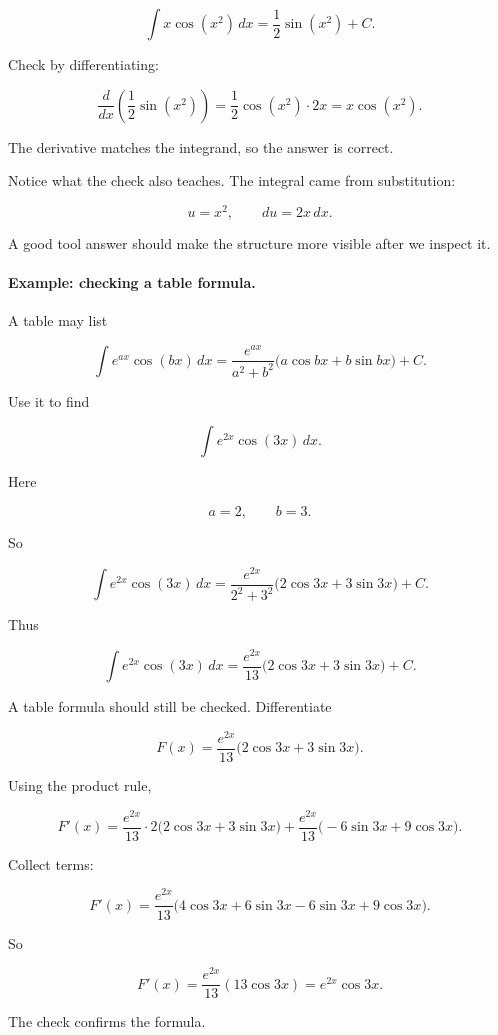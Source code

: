 \[
\int x\cos(x^2)\,dx=\frac12\sin(x^2)+C.
\]

Check by differentiating:

\[
\frac{d}{dx}\left(\frac12\sin(x^2)\right)
=
\frac12\cos(x^2)\cdot 2x
=
x\cos(x^2).
\]

The derivative matches the integrand, so the answer is correct.

Notice what the check also teaches.  The integral came from substitution:

\[
u=x^2,
\qquad
du=2x\,dx.
\]

A good tool answer should make the structure more visible after we inspect it.

\paragraph{Example: checking a table formula.}
A table may list

\[
\int e^{ax}\cos(bx)\,dx
=
\frac{e^{ax}}{a^2+b^2}\bigl(a\cos bx+b\sin bx\bigr)+C.
\]

Use it to find

\[
\int e^{2x}\cos(3x)\,dx.
\]

Here

\[
a=2,
\qquad
b=3.
\]

So

\[
\int e^{2x}\cos(3x)\,dx
=
\frac{e^{2x}}{2^2+3^2}\bigl(2\cos 3x+3\sin 3x\bigr)+C.
\]

Thus

\[
\boxed{
\int e^{2x}\cos(3x)\,dx
=
\frac{e^{2x}}{13}\bigl(2\cos 3x+3\sin 3x\bigr)+C.
}
\]

A table formula should still be checked.  Differentiate

\[
F(x)=\frac{e^{2x}}{13}\bigl(2\cos 3x+3\sin 3x\bigr).
\]

Using the product rule,

\[
F'(x)
=
\frac{e^{2x}}{13}\cdot 2\bigl(2\cos 3x+3\sin 3x\bigr)
+
\frac{e^{2x}}{13}\bigl(-6\sin 3x+9\cos 3x\bigr).
\]

Collect terms:

\[
F'(x)
=
\frac{e^{2x}}{13}
\bigl(4\cos 3x+6\sin 3x-6\sin 3x+9\cos 3x\bigr).
\]

So

\[
F'(x)
=
\frac{e^{2x}}{13}(13\cos 3x)
=
e^{2x}\cos 3x.
\]

The check confirms the formula.

